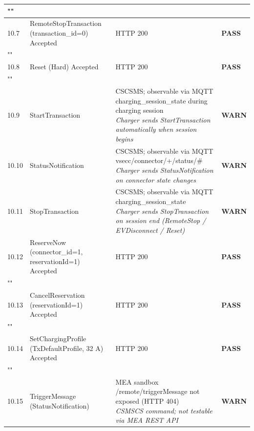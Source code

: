 \documentclass[10pt, a4paper]{article}
\begin{document}
\begin{longtable}{|L{1cm}|L{5.5cm}|M{7cm}|C{1.8cm}|}
\hline
{} \\
\hline
\small 10.7 & \small RemoteStopTransaction (transaction\_id=0)  Accepted & HTTP 200 & \textcolor{passgreen}{\textbf{PASS}} \\
\hline
{} \\
\hline
\small 10.8 & \small Reset (Hard)  Accepted & HTTP 200 & \textcolor{passgreen}{\textbf{PASS}} \\
\hline
{} \\
\hline
\small 10.9 & \small StartTransaction & CSCSMS; observable via MQTT charging\_session\_state during charging session{\newline\normalfont\footnotesize\itshape Charger sends StartTransaction automatically when session begins} & \textcolor{warnorange}{\textbf{WARN}} \\
\hline
\small 10.10 & \small StatusNotification & CSCSMS; observable via MQTT vsecc/connector/+/status/\#{\newline\normalfont\footnotesize\itshape Charger sends StatusNotification on connector state changes} & \textcolor{warnorange}{\textbf{WARN}} \\
\hline
\small 10.11 & \small StopTransaction & CSCSMS; observable via MQTT charging\_session\_state{\newline\normalfont\footnotesize\itshape Charger sends StopTransaction on session end (RemoteStop / EVDisconnect / Reset)} & \textcolor{warnorange}{\textbf{WARN}} \\
\hline
\small 10.12 & \small ReserveNow (connector\_id=1, reservationId=1)  Accepted & HTTP 200 & \textcolor{passgreen}{\textbf{PASS}} \\
\hline
{} \\
\hline
\small 10.13 & \small CancelReservation (reservationId=1)  Accepted & HTTP 200 & \textcolor{passgreen}{\textbf{PASS}} \\
\hline
{} \\
\hline
\small 10.14 & \small SetChargingProfile (TxDefaultProfile, 32 A)  Accepted & HTTP 200 & \textcolor{passgreen}{\textbf{PASS}} \\
\hline
{} \\
\hline
\small 10.15 & \small TriggerMessage (StatusNotification) & MEA sandbox /remote/triggerMessage not exposed (HTTP 404){\newline\normalfont\footnotesize\itshape CSMSCS command; not testable via MEA REST API} & \textcolor{warnorange}{\textbf{WARN}} \\

\end{longtable}
\end{document}
